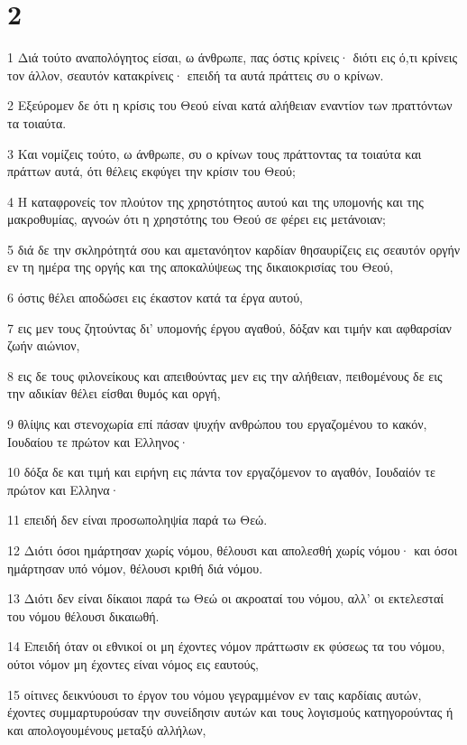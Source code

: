 \chapter{2}

\par 1 Διά τούτο αναπολόγητος είσαι, ω άνθρωπε, πας όστις κρίνεις· διότι εις ό,τι κρίνεις τον άλλον, σεαυτόν κατακρίνεις· επειδή τα αυτά πράττεις συ ο κρίνων.
\par 2 Εξεύρομεν δε ότι η κρίσις του Θεού είναι κατά αλήθειαν εναντίον των πραττόντων τα τοιαύτα.
\par 3 Και νομίζεις τούτο, ω άνθρωπε, συ ο κρίνων τους πράττοντας τα τοιαύτα και πράττων αυτά, ότι θέλεις εκφύγει την κρίσιν του Θεού;
\par 4 Η καταφρονείς τον πλούτον της χρηστότητος αυτού και της υπομονής και της μακροθυμίας, αγνοών ότι η χρηστότης του Θεού σε φέρει εις μετάνοιαν;
\par 5 διά δε την σκληρότητά σου και αμετανόητον καρδίαν θησαυρίζεις εις σεαυτόν οργήν εν τη ημέρα της οργής και της αποκαλύψεως της δικαιοκρισίας του Θεού,
\par 6 όστις θέλει αποδώσει εις έκαστον κατά τα έργα αυτού,
\par 7 εις μεν τους ζητούντας δι' υπομονής έργου αγαθού, δόξαν και τιμήν και αφθαρσίαν ζωήν αιώνιον,
\par 8 εις δε τους φιλονείκους και απειθούντας μεν εις την αλήθειαν, πειθομένους δε εις την αδικίαν θέλει είσθαι θυμός και οργή,
\par 9 θλίψις και στενοχωρία επί πάσαν ψυχήν ανθρώπου του εργαζομένου το κακόν, Ιουδαίου τε πρώτον και Ελληνος·
\par 10 δόξα δε και τιμή και ειρήνη εις πάντα τον εργαζόμενον το αγαθόν, Ιουδαίόν τε πρώτον και Ελληνα·
\par 11 επειδή δεν είναι προσωποληψία παρά τω Θεώ.
\par 12 Διότι όσοι ημάρτησαν χωρίς νόμου, θέλουσι και απολεσθή χωρίς νόμου· και όσοι ημάρτησαν υπό νόμον, θέλουσι κριθή διά νόμου.
\par 13 Διότι δεν είναι δίκαιοι παρά τω Θεώ οι ακροαταί του νόμου, αλλ' οι εκτελεσταί του νόμου θέλουσι δικαιωθή.
\par 14 Επειδή όταν οι εθνικοί οι μη έχοντες νόμον πράττωσιν εκ φύσεως τα του νόμου, ούτοι νόμον μη έχοντες είναι νόμος εις εαυτούς,
\par 15 οίτινες δεικνύουσι το έργον του νόμου γεγραμμένον εν ταις καρδίαις αυτών, έχοντες συμμαρτυρούσαν την συνείδησιν αυτών και τους λογισμούς κατηγορούντας ή και απολογουμένους μεταξύ αλλήλων,
